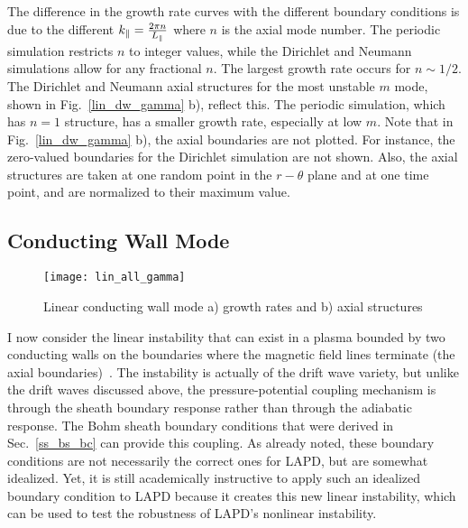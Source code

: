 The difference in the growth rate curves with the different boundary conditions is due to the different $k_\parallel = \frac{2 \pi n}{L_\parallel}$ where $n$ is the axial mode number. The periodic simulation
restricts $n$ to integer values, while the Dirichlet and Neumann simulations allow for any fractional $n$. The largest growth rate occurs for $n \sim 1/2$. The Dirichlet and Neumann axial structures
for the most unstable $m$ mode, shown in Fig.~\ref{lin_dw_gamma} b), reflect this. The periodic simulation, which has $n=1$ structure, has a smaller growth rate, especially at low $m$. Note that in
Fig.~\ref{lin_dw_gamma} b), the axial boundaries are not plotted. For instance, the zero-valued boundaries for the Dirichlet simulation are not shown. Also, the axial structures are taken at one
random point in the $r-\theta$ plane and at one time point, and are normalized to their maximum value.

\subsection{Conducting Wall Mode}
\label{ss_cwm}

\begin{figure}[!ht]
\centerline{\texttt{[image: lin\_all\_gamma]}}
\caption{Linear conducting wall mode a) growth rates and b) axial structures}
\label{lin_all_gamma}
\end{figure}


I now consider the linear instability that can exist in a plasma bounded by two conducting walls on the boundaries where the magnetic field lines terminate
(the axial boundaries)~\cite{berk1991,berk1993,xu1993}.
The instability is actually of the drift wave variety, but unlike the drift waves discussed above, the pressure-potential coupling mechanism is through the sheath boundary response
rather than through the adiabatic response. The Bohm sheath boundary conditions that were derived in Sec.~\ref{ss_bs_bc} can provide this coupling. 
As already noted, these boundary conditions are not necessarily the correct ones
for LAPD, but are somewhat idealized. Yet, it is still academically instructive to apply such an idealized boundary condition to LAPD because it creates this new linear instability, which
can be used to test the robustness of LAPD's nonlinear instability.

